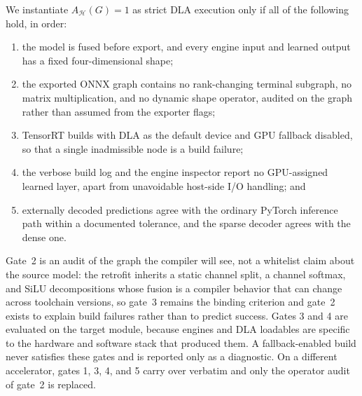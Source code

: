 We instantiate $A_{\mathcal{H}}(G)=1$ as strict DLA execution only if all of the
following hold, in order:
\begin{enumerate}
  \item the model is fused before export, and every engine input and learned
  output has a fixed four-dimensional shape;
  \item the exported ONNX graph contains no rank-changing terminal subgraph, no
  matrix multiplication, and no dynamic shape operator, audited on the graph
  rather than assumed from the exporter flags;
  \item TensorRT builds with DLA as the default device and GPU fallback
  disabled, so that a single inadmissible node is a build failure;
  \item the verbose build log and the engine inspector report no GPU-assigned
  learned layer, apart from unavoidable host-side I/O handling; and
  \item externally decoded predictions agree with the ordinary PyTorch
  inference path within a documented tolerance, and the sparse decoder agrees
  with the dense one.
\end{enumerate}
Gate~2 is an audit of the graph the compiler will see, not a whitelist claim
about the source model: the retrofit inherits a static channel split, a channel
softmax, and SiLU decompositions whose fusion is a compiler behavior that can
change across toolchain versions, so gate~3 remains the binding criterion and
gate~2 exists to explain build failures rather than to predict success. Gates 3
and 4 are evaluated on the target module, because engines and DLA loadables are
specific to the hardware and software stack that produced them. A
fallback-enabled build never satisfies these gates and is reported only as a
diagnostic. On a different accelerator, gates 1, 3, 4, and 5 carry over
verbatim and only the operator audit of gate~2 is replaced.
